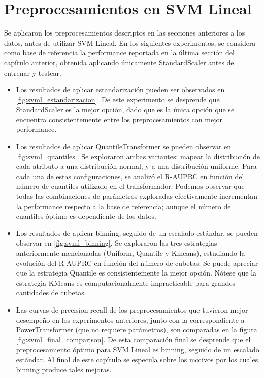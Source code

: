 \section { Preprocesamientos en SVM Lineal }

Se aplicaron los preprocesamientos descriptos en las secciones anteriores a los datos, antes de utilizar SVM Lineal. En los siguientes experimentos, se considera como base de referencia la performance reportada en la última sección del capítulo anterior, obtenida aplicando únicamente StandardScaler antes de entrenar y testear. 

\begin{itemize}

\item Los resultados de aplicar estandarización pueden ser observados en \ref{fig:svml_estandarizacion}. De este experimento se desprende que StandardScaler es la mejor opción, dado que es la única opción que se encuentra consistentemente entre los preprocesamientos con mejor performance.

\item Los resultados de aplicar QuantileTransformer se pueden observar en \ref{fig:svml_quantiles}. Se exploraron ambas variantes: mapear la distribución de cada atributo a una distribución normal, y a una distribución uniforme. Para cada una de estas configuraciones, se analizó el R-AUPRC en función del número de cuantiles utilizado en el transformador. Podemos observar que todas las combinaciones de parámetros exploradas efectivamente incrementan la performance respecto a la base de referencia; aunque el número de cuantiles óptimo es dependiente de los datos.

\item Los resultados de aplicar binning, seguido de un escalado estándar, se pueden observar en \ref{fig:svml_binning}. Se exploraron las tres estrategias anteriormente mencionadas (Uniform, Quantile y Kmeans), estudiando la evolución del R-AUPRC en función del número de cubetas. Se puede apreciar que la estrategia Quantile es consistentemente la mejor opción. Nótese que la estrategia KMeans es computacionalmente impracticable para grandes cantidades de cubetas.

\item Las curvas de precision-recall de los preprocesamientos que tuvieron mejor desempeño en los experimentos anteriores, junto con la correspondiente a PowerTransformer (que no requiere parámetros), son comparadas en la figura \ref{fig:svml_final_comparison}. De esta comparación final se desprende que el preprocesamiento óptimo para SVM Lineal es binning, seguido de un escalado estándar. Al final de este capítulo se especula sobre los motivos por los cuales binning produce tales mejoras.
\end{itemize}



